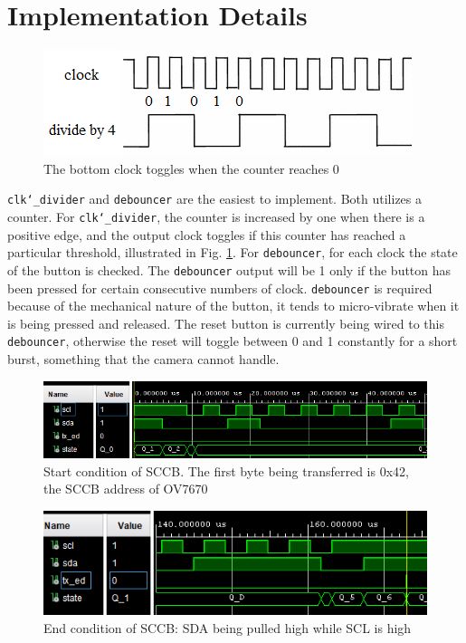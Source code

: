 \documentclass{IEEEtran}
\begin{document}
	\section{Implementation Details}
	\begin{figure}[h]
		\centering
		\includegraphics[scale=0.6]{clockdivider}
		\caption{The bottom clock toggles when the counter reaches 0}
		\label{fig:clockdivider}
	\end{figure}
	\texttt{clk\char`_divider} and \texttt{debouncer} are the easiest to implement. Both utilizes a counter. For \texttt{clk\char`_divider}, the counter is increased by one when there is a positive edge, and the output clock toggles if this counter has reached a particular threshold, illustrated in Fig. \ref{fig:clockdivider}. For \texttt{debouncer}, for each clock the state of the button is checked. The \texttt{debouncer} output will be 1 only if the button has been pressed for certain consecutive numbers of clock. \texttt{debouncer} is required because of the mechanical nature of the button, it tends to micro-vibrate when it is being pressed and released. The reset button is currently being wired to this \texttt{debouncer}, otherwise the reset will toggle between 0 and 1 constantly for a short burst, something that the camera cannot handle.
	
	\begin{figure}[h]
		\centering
		\includegraphics[scale=0.52]{sccb1}
		\caption{Start condition of SCCB. The first byte being transferred is 0x42, the SCCB address of OV7670}
		\label{fig:sccb1}
	\end{figure}
	\begin{figure}[h]
		\centering
		\includegraphics[scale=0.52]{sccb2}
		\caption{End condition of SCCB: SDA being pulled high while SCL is high}
		\label{fig:sccb2}
	\end{figure}
	
\end{document}
